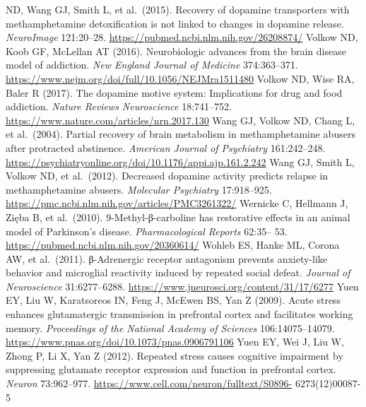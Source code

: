ND, Wang GJ, Smith L, et al.~(2015). Recovery of dopamine transporters with methamphetamine detoxification is not linked to changes in dopamine release. \emph{NeuroImage} 121:20--28. \url{https://pubmed.ncbi.nlm.nih.gov/26208874/} Volkow ND, Koob GF, McLellan AT (2016). Neurobiologic advances from the brain disease model of addiction. \emph{New England Journal of Medicine} 374:363--371. \url{https://www.nejm.org/doi/full/10.1056/NEJMra1511480} Volkow ND, Wise RA, Baler R (2017). The dopamine motive system: Implications for drug and food addiction. \emph{Nature Reviews Neuroscience} 18:741--752. \url{https://www.nature.com/articles/nrn.2017.130} Wang GJ, Volkow ND, Chang L, et al.~(2004). Partial recovery of brain metabolism in methamphetamine abusers after protracted abstinence. \emph{American Journal of Psychiatry} 161:242--248. \url{https://psychiatryonline.org/doi/10.1176/appi.ajp.161.2.242} Wang GJ, Smith L, Volkow ND, et al.~(2012). Decreased dopamine activity predicts relapse in methamphetamine abusers. \emph{Molecular Psychiatry} 17:918--925. \url{https://pmc.ncbi.nlm.nih.gov/articles/PMC3261322/} Wernicke C, Hellmann J, Zięba B, et al.~(2010). 9-Methyl-β-carboline has restorative effects in an animal model of Parkinson's disease. \emph{Pharmacological Reports} 62:35-- 53. \url{https://pubmed.ncbi.nlm.nih.gov/20360614/} Wohleb ES, Hanke ML, Corona AW, et al.~(2011). β-Adrenergic receptor antagonism prevents anxiety-like behavior and microglial reactivity induced by repeated social defeat. \emph{Journal of Neuroscience} 31:6277--6288. \url{https://www.jneurosci.org/content/31/17/6277} Yuen EY, Liu W, Karatsoreos IN, Feng J, McEwen BS, Yan Z (2009). Acute stress enhances glutamatergic transmission in prefrontal cortex and facilitates working memory. \emph{Proceedings of the National Academy of Sciences} 106:14075--14079. \url{https://www.pnas.org/doi/10.1073/pnas.0906791106} Yuen EY, Wei J, Liu W, Zhong P, Li X, Yan Z (2012). Repeated stress causes cognitive impairment by suppressing glutamate receptor expression and function in prefrontal cortex. \emph{Neuron} 73:962--977. \url{https://www.cell.com/neuron/fulltext/S0896-} 6273(12)00087-5
